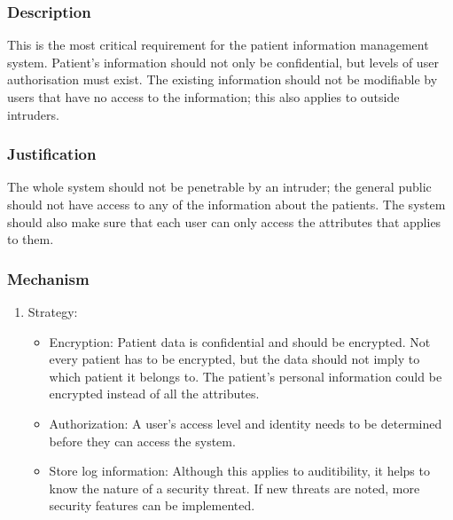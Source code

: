 \subsubsection *{Description}
This is the most critical requirement for the patient information management system. Patient's information should not only be confidential, but levels of user authorisation must exist. The existing information should not be modifiable by users that have no access to the information; this also applies to outside intruders.
\subsubsection*{Justification}
The whole system should not be penetrable by an intruder; the general public should not have access to any of the information about the patients. The system should also make sure that each user can only access the attributes that applies to them.
\subsubsection*{Mechanism}
	\begin{enumerate}
		\item Strategy:		
		 	\begin{itemize}
		 	\item Encryption: Patient data is confidential and should be encrypted. Not every patient has to be encrypted, but the data should not imply to which patient it belongs to. The patient's personal information could be encrypted instead of all the attributes.
		 	\item Authorization: A user's access level and identity needs to be determined before they can access the system. 
		 	\item Store log information: Although this applies to auditibility, it helps to know the nature of a security threat. If new threats are noted, more security features can be implemented.
		 	\end{itemize}

	\end{enumerate}